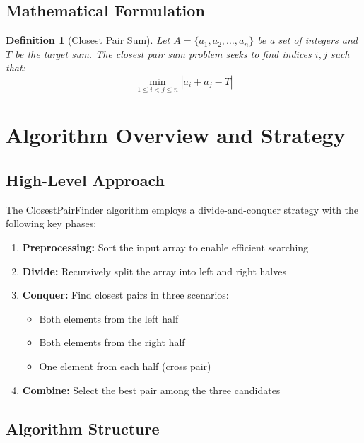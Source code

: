 \documentclass[12pt,a4paper]{article}
\newtheorem{definition}{Definition}
\begin{document}
\subsection{Mathematical Formulation}

\begin{definition}[Closest Pair Sum]
Let $A = \{a_1, a_2, \ldots, a_n\}$ be a set of integers and $T$ be the target sum. The closest pair sum problem seeks to find indices $i, j$ such that:
\[
\min_{1 \leq i < j \leq n} |a_i + a_j - T|
\]
\end{definition}

\section{Algorithm Overview and Strategy}

\subsection{High-Level Approach}

The ClosestPairFinder algorithm employs a divide-and-conquer strategy with the following key phases:

\begin{enumerate}[itemsep=0.5em]
    \item \textbf{Preprocessing:} Sort the input array to enable efficient searching
    \item \textbf{Divide:} Recursively split the array into left and right halves
    \item \textbf{Conquer:} Find closest pairs in three scenarios:
    \begin{itemize}
        \item Both elements from the left half
        \item Both elements from the right half  
        \item One element from each half (cross pair)
    \end{itemize}
    \item \textbf{Combine:} Select the best pair among the three candidates
\end{enumerate}

\subsection{Algorithm Structure}

\begin{center}
\end{center}
\end{document}
